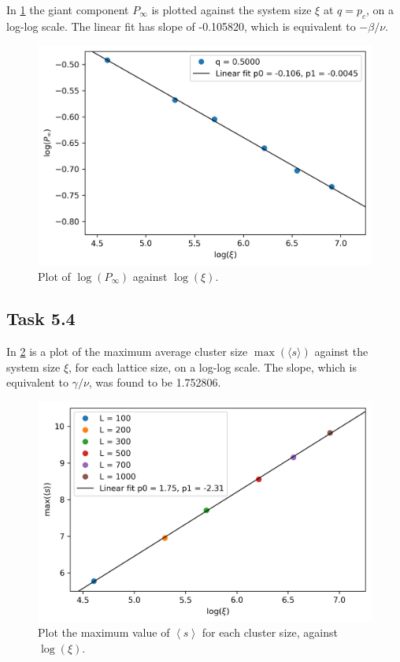 \documentclass[a4paper]{article}
\begin{document}
In \cref{fig:giant_vs_xi} the giant component $P_\infty$ is plotted against the system size $\xi$ at $q = p_c$, on a log-log scale. The linear fit has slope of -0.105820, which is equivalent to $-\beta/\nu$.
\begin{figure}[h]
    \centering
    \includegraphics[width=\textwidth]{giant_vs_xi.png}
    \caption{Plot of $\log(P_\infty)$ against $\log(\xi)$.\label{fig:giant_vs_xi}}
\end{figure}

\subsection*{Task 5.4}
In \cref{fig:clustersize} is a plot of the maximum average cluster size $\max(\langle s \rangle)$ against the system size $\xi$, for each lattice size, on a log-log scale. The slope, which is equivalent to $\gamma/\nu$, was found to be 1.752806.
\begin{figure}[h]
    \centering
    \includegraphics[width=\textwidth]{clustersize_vs_xi.png}
    \caption{Plot the maximum value of $\left<s\right>$ for each cluster size, against $\log(\xi)$. \label{fig:clustersize}}
\end{figure}
\end{document}
